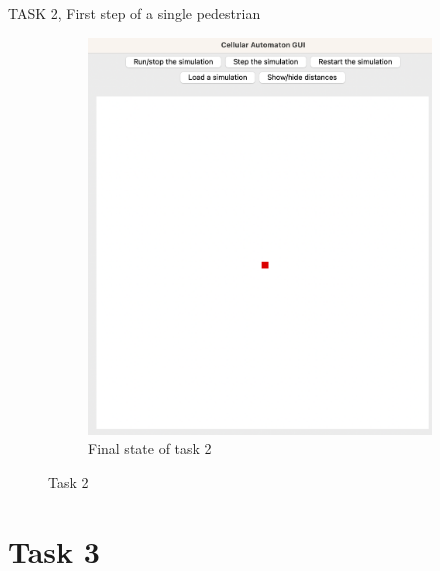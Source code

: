 \documentclass[10pt,a4paper]{article}
\begin{document}
\begin{task}{TASK 2, First step of a single pedestrian}
\begin{figure}[h]
\begin{subfigure}[b]{0.4\textwidth}
    \includegraphics[width=\textwidth]{pictures/Task2_end.png}
    \caption{Final state of task 2}
    \label{fig:Final state of task 2}
  \end{subfigure}
  \caption{Task 2}
  \label{Task 2}
\end{figure}
\end{task}

\section{Task 3}
\end{document}
